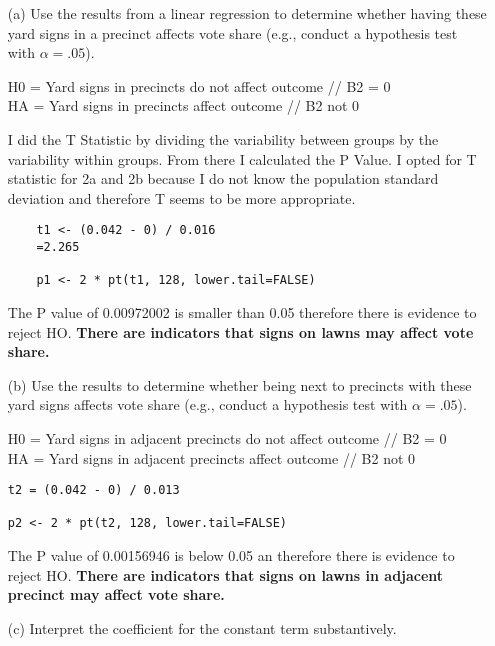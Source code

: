 \documentclass[12pt,letterpaper]{article}
\begin{document}
\vspace{.5cm}
\begin{enumerate}
	\item [(a)] Use the results from a linear regression to determine whether having these yard signs in a precinct affects vote share (e.g., conduct a hypothesis test with $\alpha = .05$).
	
H0 = Yard signs in precincts do not affect outcome // B2 = 0\\
HA = Yard signs in precincts affect outcome // B2 not 0

I did the T Statistic by dividing the variability between groups by the variability within groups. From there I calculated the P Value. I opted for T statistic for 2a and 2b because I do not know the population standard deviation and therefore T seems to be more appropriate.

\newpage

\begin{verbatim}
	t1 <- (0.042 - 0) / 0.016
	=2.265
	
	p1 <- 2 * pt(t1, 128, lower.tail=FALSE)
\end{verbatim}

The P value of 0.00972002 is smaller than 0.05  therefore there is evidence to reject HO. \textbf{There are indicators that signs on lawns may affect vote share.}
	
	\item [(b)]  Use the results to determine whether being
	next to precincts with these yard signs affects vote
	share (e.g., conduct a hypothesis test with $\alpha = .05$).
	
H0 = Yard signs in adjacent precincts do not affect outcome // B2 = 0\\
HA = Yard signs in adjacent precincts affect outcome // B2 not 0

\begin{verbatim}
t2 = (0.042 - 0) / 0.013

p2 <- 2 * pt(t2, 128, lower.tail=FALSE)
\end{verbatim}

The P value of 0.00156946 is below 0.05 an therefore there is evidence to reject HO. \textbf{There are indicators that signs on lawns in adjacent precinct may affect vote share.}
	
\newpage

	\item [(c)] Interpret the coefficient for the constant term substantively.\\
	

\end{enumerate}
\end{document}
